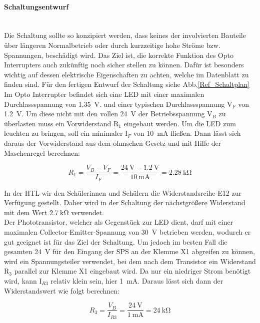 \paragraph{Schaltungsentwurf} \mbox{}\\
Die Schaltung sollte so konzipiert werden, dass keines der involvierten Bauteile über längeren Normalbetrieb oder durch kurzzeitige hohe Ströme bzw. Spannungen, beschädigt wird. Das Ziel ist, die korrekte Funktion des Opto Interrupters auch zukünftig noch sicher stellen zu können. Dafür ist besonders wichtig auf dessen elektrische Eigenschaften zu achten, welche im Datenblatt zu finden sind. Für den fertigen Entwurf der Schaltung siehe Abb.\ref{Ref_Schaltplan}\\
Im Opto Interrupter befindet sich eine LED mit einer maximalen Durchlassspannung von \qty{1.35}{\volt}. und einer typischen Durchlassspannung V$_{F}$ von \qty{1.2}{\volt}. Um diese nicht mit den vollen \qty{24}{\volt} der Betriebsspannung V$_{B}$ zu überlasten muss ein Vorwiderstand R$_{1}$ eingebaut werden. Um die LED zum leuchten zu bringen, soll ein minimaler I$_{F}$ von \qty{10}{\milli\ampere} fließen. Dann lässt sich daraus der Vorwiderstand aus dem ohmschen Gesetz und mit Hilfe der Maschenregel berechnen:

\begin{equation*}
    R_{1} = \frac{V_{B} - V_{F}}{I_{F}} = \frac{\qty{24}{\volt} - \qty{1.2}{\volt}}{\qty{10}{\milli\ampere}} = \qty{2.28}{\kilo\ohm}
\end{equation*}

In der HTL wir den Schülerinnen und Schülern die Widerstandsreihe E12 zur Verfügung gestellt. Daher wird in der Schaltung der nächstgrößere Widerstand mit dem Wert $\qty{2,7}{\kilo\ohm}$ verwendet.\\
Der Phototransistor, welcher als Gegenstück zur LED dient, darf mit einer maximalen Collector-Emitter-Spannung von \qty{30}{\volt} betrieben werden, wodurch er gut geeignet ist für das Ziel der Schaltung. Um jedoch im besten Fall die gesamten \qty{24}{\volt} für den Eingang der SPS an der Klemme X1 abgreifen zu können, wird ein Spannungsteiler verwendet, bei dem nach dem Transistor ein Widerstand R$_{3}$ parallel zur Klemme X1 eingebaut wird. Da nur ein niedriger Strom benötigt wird, kann I$_{R3}$ relativ klein sein, hier \qty{1}{\milli\ampere}. Daraus lässt sich dann der Widerstandswert wie folgt berechnen:

\begin{equation*}
    R_{3} = \frac{V_{B}}{I_{R3}} = \frac{\qty{24}{\volt}}{\qty{1}{\milli\ampere}} = \qty{24}{\kilo\ohm}
\end{equation*}

